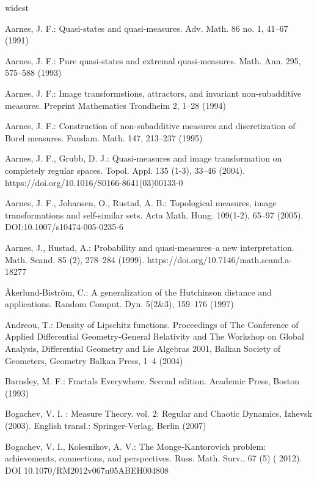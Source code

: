 \documentclass[sn-mathphys-num]{sn-jnl}%
\theoremstyle{thmstyleone}%
\theoremstyle{definition}
\begin{document}
%

\begin{thebibliography}{widest}

 Aarnes, J. F.: Quasi-states and quasi-measures. Adv. Math.  86 no. 1, 41--67 (1991)  
  
Aarnes, J. F.:  Pure quasi-states and extremal quasi-measures. Math. Ann. 295, 575--588 (1993) 
  
Aarnes, J. F.: Image transformstions, attractors, and invariant non-subadditive measures. Preprint Mathematics Trondheim 2, 1--28 (1994)

 Aarnes, J. F.:  Construction of non-subadditive measures and 
  discretization of Borel measures. Fundam. Math. 147, 213--237 (1995)

  Aarnes, J. F.,  Grubb, D. J.:   Quasi-measures and image transformation on completely regular spaces. Topol. Appl. 135 (1-3), 33--46 (2004). 
  https://doi.org/10.1016/S0166-8641(03)00133-0

Aarnes, J. F.,  Johansen, O.,  Rustad, A. B.:  Topological measures, image transformations and self-similar sets.
Acta Math. Hung. 109(1-2),  65--97 (2005). DOI:10.1007/s10474-005-0235-6
 
  Aarnes, J.,  Rustad, A.:  Probability and quasi-measures--a new interpretation. Math. Scand.  85 (2), 278--284 (1999).
  https://doi.org/10.7146/math.scand.a-18277
 
 \r{A}kerlund-Bistr{\"o}m, C.: A generalization of the Hutchinson distance and applications. Random Comput. Dyn.  5(2\&3), 159--176 (1997)
 
Andreou, T.: Density of Lipschitz functions.  Proceedings of The Conference of Applied Differential Geometry-General Relativity 
and The Workshop on Global Analysis, Differential Geometry and Lie Algebras 2001, Balkan Society of Geometers, Geometry Balkan Press,  1--4 (2004)

 Barnsley,  M. F.:  Fractals Everywhere. Second edition. Academic Press, Boston (1993)
 
   Bogachev, V. I. : Measure Theory. vol. 2:  Regular and Chaotic Dynamics, Izhevsk (2003). 
  English transl.: Springer-Verlag, Berlin  (2007) 
   
Bogachev, V. I.,   Kolesnikov,  A. V.: The Monge-Kantorovich problem: achievements, connections, and perspectives. Russ. Math. Surv., 67  (5)  ( 2012). 
DOI 10.1070/RM2012v067n05ABEH004808


\end{thebibliography}
\end{document}
